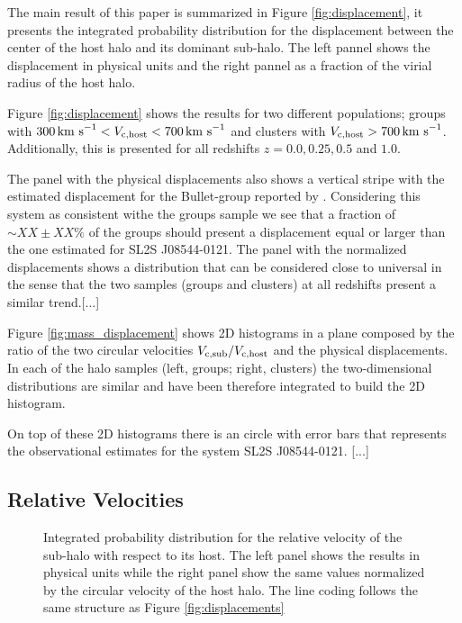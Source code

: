\documentclass{emulateapj}
\newcommand{\kms}{{\ifmmode{{\mathrm{\,km\ s}^{-1}}}\else{\,km~s$^{-1}$}\fi}}
\newcommand{\bullg}{SL2S J08544-0121}
\begin{document}
The main result of this paper is summarized in Figure
\ref{fig:displacement}, it presents the integrated
probability distribution for the displacement between the center of
the host halo and its dominant sub-halo. The left pannel shows
the displacement in physical units and the right pannel as a fraction
of the virial radius of the host halo. 

Figure \ref{fig:displacement} shows the results for two different
populations; groups with $300\kms < V_{\rm c, host}<700\kms$ and
clusters with $V_{\rm c,host}>700\kms$. Additionally, this is
presented for all redshifts $z=0.0, 0.25, 0.5$ and $1.0$. 

The panel with the physical displacements also shows a vertical stripe
with the estimated displacement for the Bullet-group reported by
\cite{Gastaldello}. Considering this system as consistent withe the
groups sample we see that a fraction of $\sim XX\pm XX\%$ of the groups
should present a displacement equal or larger than the one estimated
for \bullg. The panel with the normalized displacements shows a
distribution that can be considered close to universal in the sense
that the two samples (groups and clusters) at all redshifts present a
similar trend.[...]

Figure \ref{fig:mass_displacement} shows 2D histograms in a plane
composed by the ratio of the two circular velocities $V_{\rm c,
  sub}/V_{\rm c, host}$ and the physical displacements. In each of the
halo samples (left, groups; right, clusters) the two-dimensional
distributions are similar and have been therefore integrated to build
the 2D histogram.  

On top of these 2D histograms there is an circle with error bars that
represents the observational estimates for the system \bullg. [...]


\subsection{Relative Velocities}
\label{sec:velocities}

\begin{figure}
\begin{center}
\end{center}
\caption{Integrated probability distribution for the relative velocity of the
sub-halo with respect to its host. The left panel shows the results
in physical units while the right panel show the same values
normalized by the circular velocity of the host halo. The line coding
follows the same structure as Figure \ref{fig:displacements}}
\label{fig:velocities}
\end{figure}
\end{document}

